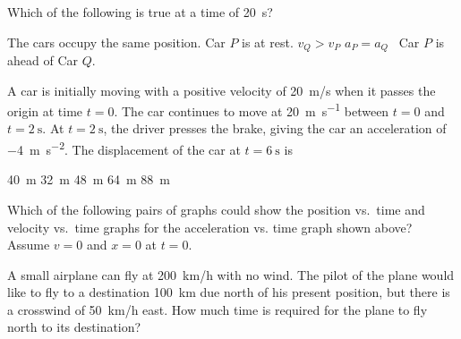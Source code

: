 \documentclass{../../../oss-classkick-exam}
\begin{document}
\begin{multicols*}{2}
\begin{questions}
    \question Which of the following is true at a time of \SI{20}{\second}?
    \begin{choices}
      \choice The cars occupy the same position.
      \choice Car $P$ is at rest.
      \choice $v_Q>v_P$
      \choice $a_P=a_Q$
      \choice\ Car $P$ is ahead of Car $Q$.
    \end{choices}
    \label{q:graph2}
    \vspace{.7in}
    
    \question A car is initially moving with a positive velocity of \SI{20}{m/s}
    when it passes the origin at time $t=0$. The car continues to move at
    \SI{20}{\metre\per\second} between $t=0$ and $t=\SI{2}{\second}$. At
    $t=\SI{2}{\second}$, the driver presses the brake, giving the car an
    acceleration of \SI{-4}{\metre\per\second^2}. The displacement of the car
    at $t=\SI{6}{\second}$ is
    \begin{choices}
      \choice\SI{40}{\metre}
      \choice\SI{32}{\metre}
      \choice\SI{48}{\metre}
      \choice\SI{64}{\metre}
      \choice\SI{88}{\metre}
    \end{choices}
  
    \question Which of the following pairs of graphs could show the position
    vs.\ time and velocity vs.\ time graphs for the acceleration vs. time graph
    shown above? Assume $v=0$ and $x=0$ at $t=0$.
    \begin{center}
    \end{center}
    \columnbreak
  
    \question A small airplane can fly at \SI{200}{km/h} with no wind. The pilot
    of the plane would like to fly to a destination \SI{100}{km} due north of
    his present position, but there is a crosswind of \SI{50}{km/h} east. How
    much time is required for the plane to fly north to its destination?
    \vspace{.7in}
    

\end{questions}
\end{multicols*}
\end{document}

